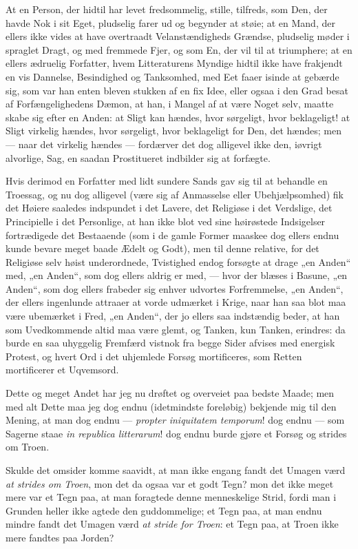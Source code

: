 \documentclass[12pt,a4paper]{book}
\begin{document}
At en Person, der hidtil har levet fredsommelig, stille, tilfreds, som Den, der
havde Nok i sit Eget, pludselig farer ud og begynder at støie; at en Mand, der
ellers ikke vides at have overtraadt Velanstændigheds Grændse, pludselig møder
i spraglet Dragt, og med fremmede Fjer, og som En, der vil til at triumphere;
at en ellers ædruelig Forfatter, hvem Litteraturens Myndige hidtil ikke have
frakjendt en vis Dannelse, Besindighed og Tanksomhed, med Eet faaer isinde at
gebærde sig, som var han enten bleven stukken af en fix Idee, eller ogsaa i den
Grad besat af Forfængelighedens Dæmon, at han, i Mangel af at være Noget selv,
maatte skabe sig efter en Anden: at Sligt kan hændes, hvor sørgeligt, hvor
beklageligt! at Sligt virkelig hændes, hvor sørgeligt, hvor beklageligt for
Den, det hændes; men --- naar det virkelig hændes --- fordærver det dog
alligevel ikke den, iøvrigt alvorlige, Sag, en saadan Prostitueret indbilder
sig at forfægte.

Hvis derimod en Forfatter med lidt sundere Sands gav sig til at behandle en
Troessag, og nu dog alligevel (være sig af Anmasselse eller Ubehjælpsomhed) fik
det Høiere saaledes indspundet i det Lavere, det Religiøse i det Verdslige, det
Principielle i det Personlige, at han ikke blot ved sine høirøstede Indsigelser
fortrædigede det Bestaaende (som i de gamle Former maaskee dog ellers endnu
kunde bevare meget baade Ædelt og Godt), men til denne relative, for det
Religiøse selv høist underordnede, Tvistighed endog forsøgte at drage „en
Anden“ med, „en Anden“, som dog ellers aldrig er med, --- hvor der blæses i
Basune, „en Anden“, som dog ellers frabeder sig enhver udvortes Forfremmelse,
„en Anden“, der ellers ingenlunde attraaer at vorde udmærket i Krige, naar han
saa blot maa være ubemærket i Fred, „en Anden“, der jo ellers saa indstændig
beder, at han som Uvedkommende altid maa være glemt, og Tanken, kun Tanken,
erindres: da burde en saa uhyggelig Fremfærd vistnok fra begge Sider afvises
med energisk Protest, og hvert Ord i det uhjemlede Forsøg mortificeres, som
Retten mortificerer et Uqvemsord.

Dette og meget Andet har jeg nu drøftet og overveiet paa bedste Maade; men med
alt Dette maa jeg dog endnu (idetmindste foreløbig) bekjende mig til den
Mening, at man dog endnu --- \textit{propter iniquitatem temporum}! dog endnu
--- som Sagerne staae \textit{in republica litterarum}! dog endnu burde gjøre
et Forsøg og strides om Troen.

Skulde det omsider komme saavidt, at man ikke engang fandt det Umagen værd \emph{at
strides om Troen}, mon det da ogsaa var et godt Tegn? mon det ikke meget mere
var et Tegn paa, at man foragtede denne menneskelige Strid, fordi man i Grunden
heller ikke agtede den guddommelige; et Tegn paa, at man endnu mindre fandt det
Umagen værd \emph{at stride for Troen}: et Tegn paa, at Troen ikke mere fandtes paa
Jorden?
\end{document}
